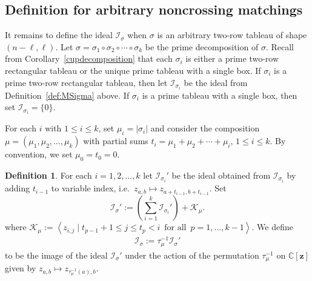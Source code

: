 \documentclass[11pt]{amsart}
\theoremstyle{remark}
\theoremstyle{remark}
\theoremstyle{definition}
\theoremstyle{definition}
\theoremstyle{definition}
\newtheorem{definition}[theorem]{Definition}
\numberwithin{equation}{section}
\newcommand{\C}{\mathbb{C}}           %
\newcommand{\gs}{\sigma}
\newcommand{\ci}{\mathcal{I}}
\newcommand{\parsum}{t}
\begin{document}
\subsection{Definition for arbitrary noncrossing matchings} It remains to define the ideal $\ci_\gs$ when $\gs$ is an arbitrary two-row tableau of shape $(n-\ell, \ell)$. Let $\gs=\gs_1\circ\gs_2\circ \cdots \circ \gs_k$ be the prime decomposition of $\gs$. Recall from Corollary~\ref{cupdecomposition} that each $\gs_i$ is either a prime two-row rectangular tableau or the unique prime tableau with a single box. If $\gs_i$ is a prime two-row rectangular tableau, then let $\ci_{\gs_i}$ be the ideal from Definition~\ref{def:MSigma} above. If $\gs_i$ is a prime tableau with a single box, then set $\ci_{\gs_i} = \{0\}$. 

For each $i$ with $1\leq i \leq k$, set $\mu_i = |\gs_i|$ and consider the composition $\mu=(\mu_1, \mu_2, \ldots, \mu_k)$ with partial sums $\parsum_i = \mu_1+\mu_2+\cdots +\mu_{i}$, $1\leq i \leq k$. By convention, we set $\mu_{0}=\parsum_0=0$. 

\begin{definition}\label{def.general} For each $i=1, 2, \ldots, k$ let $\ci_{\gs_i}'$ be the ideal obtained from $\ci_{\gs_i}$ by adding $\parsum_{i-1}$ to variable index, i.e.~$z_{a,b}\mapsto z_{a+\parsum_{i-1}, b+\parsum_{i-1}}$.  Set
\[
\ci_\gs' := \left( \sum_{i=1}^k \ci_{\gs_i}' \right)+ \mathcal{K}_\mu.
\]
where $\mathcal{K}_\mu:=\left< z_{i,j}\mid \parsum_{p-1}+1\leq j \leq \parsum_p<i \, \text{ for all }\, p= 1, \ldots, k-1 \right>$. We define
\begin{eqnarray}\label{eqn.gen.definition}
\ci_\gs := \tau_\mu^{-1} \ci_\gs'
\end{eqnarray}
to be the image of the ideal $\ci_\gs'$ under the action of the permutation $\tau_\mu^{-1}$ on $\C[\mathbf{z}]$ given by $z_{a,b}\mapsto z_{\tau_\mu^{-1}(a), b}$. 
\end{definition}
\end{document}
